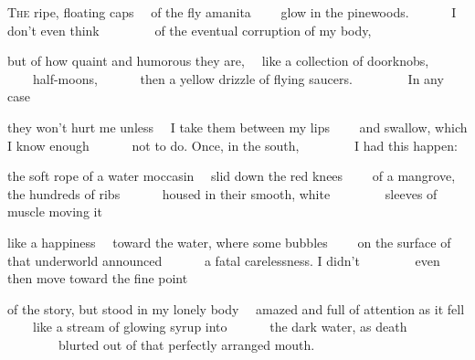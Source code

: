 
\begin{poem}
\begin{stanza}
\textsc{The} ripe, floating caps\verseline
~~of the fly amanita\verseline
~~~~glow in the pinewoods.\verseline
~~~~~~I don't even think\verseline
~~~~~~~~of the eventual corruption of my body,
\end{stanza}

\begin{stanza}
but of how quaint and humorous they are,\verseline
~~like a collection of doorknobs,\verseline
~~~~half-moons,\verseline
~~~~~~then a yellow drizzle of flying saucers.\verseline
~~~~~~~~In any case
\end{stanza}

\begin{stanza}
they won't hurt me unless\verseline
~~I take them between my lips\verseline
~~~~and swallow, which I know enough\verseline
~~~~~~not to do. Once, in the south,\verseline
~~~~~~~~I had this happen:
\end{stanza}

\begin{stanza}
the soft rope of a water moccasin\verseline
~~slid down the red knees\verseline
~~~~of a mangrove, the hundreds of ribs\verseline
~~~~~~housed in their smooth, white\verseline
~~~~~~~~sleeves of muscle moving it
\end{stanza}

\begin{stanza}
like a happiness\verseline
~~toward the water, where some bubbles\verseline
~~~~on the surface of that underworld announced\verseline
~~~~~~a fatal carelessness. I didn't\verseline
~~~~~~~~even then move toward the fine point
\end{stanza}

\begin{stanza}
of the story, but stood in my lonely body\verseline
~~amazed and full of attention as it fell\verseline
~~~~like a stream of glowing syrup into\verseline
~~~~~~the dark water, as death\verseline
~~~~~~~~blurted out of that perfectly arranged mouth.
\end{stanza}
\end{poem}